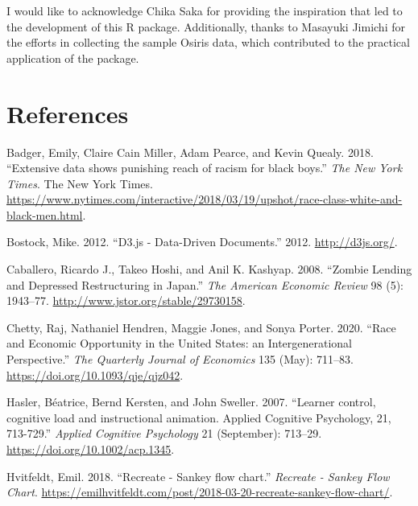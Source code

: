 I would like to acknowledge Chika Saka for providing the inspiration that led to the development of this R package. Additionally, thanks to Masayuki Jimichi for the efforts in collecting the sample Osiris data, which contributed to the practical application of the package.

\hypertarget{references}{%
\section*{References}\label{references}}

\hypertarget{refs}{}
\begin{CSLReferences}{1}{0}
\leavevmode{}%
Badger, Emily, Claire Cain Miller, Adam Pearce, and Kevin Quealy. 2018. {``{Extensive data shows punishing reach of racism for black boys}.''} \emph{The New York Times}. The New York Times. \url{https://www.nytimes.com/interactive/2018/03/19/upshot/race-class-white-and-black-men.html}.

\leavevmode{}%
Bostock, Mike. 2012. {``{D3.js - Data-Driven Documents}.''} 2012. \url{http://d3js.org/}.

\leavevmode{}%
Caballero, Ricardo J., Takeo Hoshi, and Anil K. Kashyap. 2008. {``{Zombie Lending and Depressed Restructuring in Japan}.''} \emph{The American Economic Review} 98 (5): 1943--77. \url{http://www.jstor.org/stable/29730158}.

\leavevmode{}%
Chetty, Raj, Nathaniel Hendren, Maggie Jones, and Sonya Porter. 2020. {``{Race and Economic Opportunity in the United States: an Intergenerational Perspective}.''} \emph{The Quarterly Journal of Economics} 135 (May): 711--83. \url{https://doi.org/10.1093/qje/qjz042}.

\leavevmode{}%
Hasler, Béatrice, Bernd Kersten, and John Sweller. 2007. {``{Learner control, cognitive load and instructional animation. Applied Cognitive Psychology, 21, 713-729}.''} \emph{Applied Cognitive Psychology} 21 (September): 713--29. \url{https://doi.org/10.1002/acp.1345}.

\leavevmode{}%
Hvitfeldt, Emil. 2018. {``{Recreate - Sankey flow chart}.''} \emph{Recreate - Sankey Flow Chart}. \url{https://emilhvitfeldt.com/post/2018-03-20-recreate-sankey-flow-chart/}.


\end{CSLReferences}
